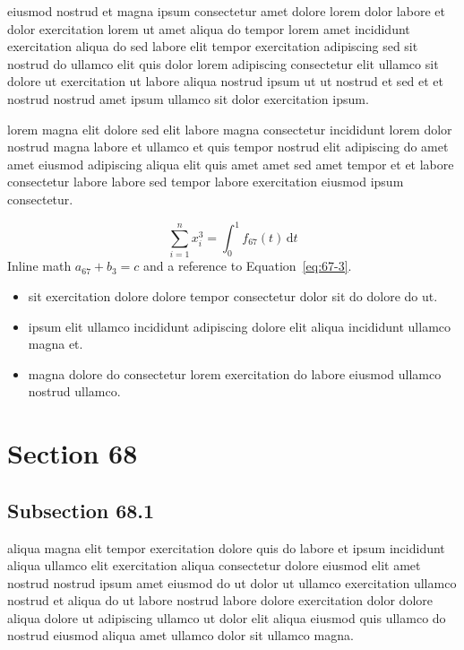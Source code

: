 \documentclass{article}
\begin{document}
eiusmod nostrud et magna ipsum consectetur amet dolore lorem dolor labore et dolor exercitation lorem ut amet aliqua do tempor lorem amet incididunt exercitation aliqua do sed labore elit tempor exercitation adipiscing sed sit nostrud do ullamco elit quis dolor lorem adipiscing consectetur elit ullamco sit dolore ut exercitation ut labore aliqua nostrud ipsum ut ut nostrud et sed et et nostrud nostrud amet ipsum ullamco sit dolor exercitation ipsum.

lorem magna elit dolore sed elit labore magna consectetur incididunt lorem dolor nostrud magna labore et ullamco et quis tempor nostrud elit adipiscing do amet amet eiusmod adipiscing aliqua elit quis amet amet sed amet tempor et et labore consectetur labore labore sed tempor labore exercitation eiusmod ipsum consectetur.

\begin{equation}\label{eq:67-3}
  \sum_{i=1}^{n} x_i^{3} = \int_0^1 f_{67}(t)\,\mathrm{d}t
\end{equation}
Inline math $a_{67} + b_{3} = c$ and a reference to Equation~\eqref{eq:67-3}.

\begin{itemize}
  \item sit exercitation dolore dolore tempor consectetur dolor sit do dolore do ut.
  \item ipsum elit ullamco incididunt adipiscing dolore elit aliqua incididunt ullamco magna et.
  \item magna dolore do consectetur lorem exercitation do labore eiusmod ullamco nostrud ullamco.
\end{itemize}

\section{Section 68}\label{sec:68}
\subsection{Subsection 68.1}\label{sec:68-1}
aliqua magna elit tempor exercitation dolore quis do labore et ipsum incididunt aliqua ullamco elit exercitation aliqua consectetur dolore eiusmod elit amet nostrud nostrud ipsum amet eiusmod do ut dolor ut ullamco exercitation ullamco nostrud et aliqua do ut labore nostrud labore dolore exercitation dolor dolore aliqua dolore ut adipiscing ullamco ut dolor elit aliqua eiusmod quis ullamco do nostrud eiusmod aliqua amet ullamco dolor sit ullamco magna.
\end{document}
